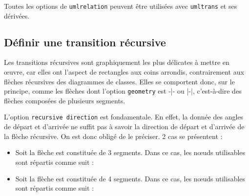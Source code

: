 \documentclass[a4paper,11pt]{report}
\newcommand{\inputTikZ}[1]{%
  }%
\newcommand{\inputTikZ}[1]{%
    \texttt{[image: fig/\#1.pdf]}%
  }%
\begin{document}
\medskip

\begin{minipage}{0.51\textwidth}

\end{minipage}
\begin{minipage}{0.49\textwidth}
\begin{center}
\inputTikZ{transition}
\end{center}
\end{minipage}

\medskip

Toutes les options de {\tt umlrelation} peuvent être utilisées avec {\tt umltrans} et ses dérivées.

\subsection{Définir une transition récursive}\label{s.rectrans}

Les transitions récursives sont graphiquement les plus délicates à mettre en \oe{}uvre, car elles ont l'aspect de rectangles aux coins arrondis, contrairement aux flèches récursives des diagrammes de classes. Elles se comportent donc, sur le principe, comme les flèches dont l'option {\tt geometry} est -|- ou |-|, c'est-à-dire des flèches composées de plusieurs segments.

\medskip

\begin{minipage}{0.51\textwidth}

\end{minipage}
\begin{minipage}{0.49\textwidth}
\begin{center}
\inputTikZ{transitionrec}
\end{center}
\end{minipage}

\medskip

L'option {\tt recursive direction} est fondamentale. En effet, la donnée des angles de départ et d'arrivée ne suffit pas à savoir la direction de départ et d'arrivée de la flèche récursive. On est donc obligé de le préciser. 2 cas se présentent :

\medskip

\begin{itemize}
\item Soit la flèche est constituée de 3 segments. Dans ce cas, les n\oe{}uds utilisables sont répartis comme suit :

\begin{center}
\inputTikZ{transitionrec-rtr-ptname}
\end{center}

\item Soit la flèche est constituée de 4 segments. Dans ce cas, les n\oe{}uds utilisables sont répartis comme suit :

\medskip

\begin{center}
\inputTikZ{transitionrec-rtb-ptname}
\end{center}

\vspace{-4cm}

\end{itemize}
\end{document}
